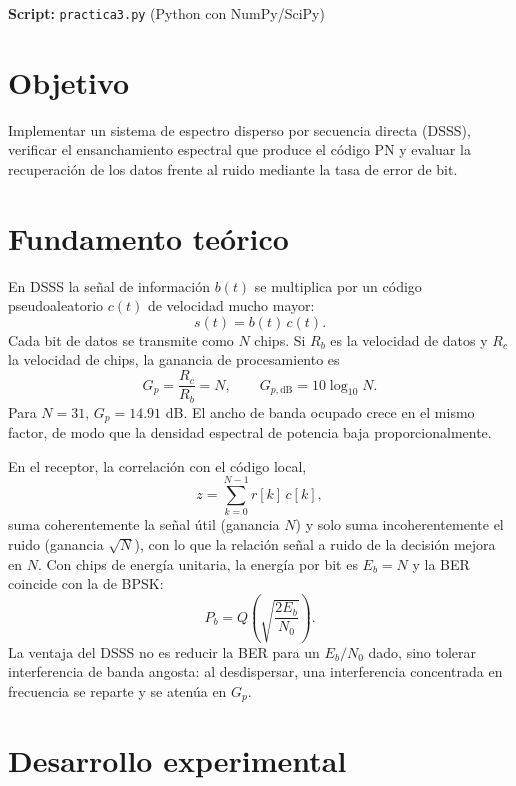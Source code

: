 \documentclass[11pt,a4paper]{article}
\begin{document}

\textbf{Script:} \texttt{practica3.py} (Python con NumPy/SciPy)

\section{Objetivo}

Implementar un sistema de espectro disperso por secuencia directa (DSSS), verificar el
ensanchamiento espectral que produce el código PN y evaluar la recuperación de los datos
frente al ruido mediante la tasa de error de bit.

\section{Fundamento teórico}

En DSSS la señal de información $b(t)$ se multiplica por un código pseudoaleatorio $c(t)$
de velocidad mucho mayor:
\begin{equation}
  s(t) = b(t)\,c(t).
\end{equation}
Cada bit de datos se transmite como $N$ chips. Si $R_b$ es la velocidad de datos y $R_c$
la velocidad de chips, la ganancia de procesamiento es
\begin{equation}
  G_p = \frac{R_c}{R_b} = N,
  \qquad
  G_{p,\mathrm{dB}} = 10\log_{10} N.
\end{equation}
Para $N=31$, $G_p=14.91$ dB. El ancho de banda ocupado crece en el mismo factor, de modo
que la densidad espectral de potencia baja proporcionalmente.

En el receptor, la correlación con el código local,
\begin{equation}
  z = \sum_{k=0}^{N-1} r[k]\,c[k],
\end{equation}
suma coherentemente la señal útil (ganancia $N$) y solo suma incoherentemente el ruido
(ganancia $\sqrt{N}$), con lo que la relación señal a ruido de la decisión mejora en $N$.
Con chips de energía unitaria, la energía por bit es $E_b=N$ y la BER coincide con la de
BPSK:
\begin{equation}
  P_b = Q\!\left(\sqrt{\frac{2E_b}{N_0}}\right).
\end{equation}
La ventaja del DSSS no es reducir la BER para un $E_b/N_0$ dado, sino tolerar
interferencia de banda angosta: al desdispersar, una interferencia concentrada en
frecuencia se reparte y se atenúa en $G_p$.

\section{Desarrollo experimental}
\end{document}

